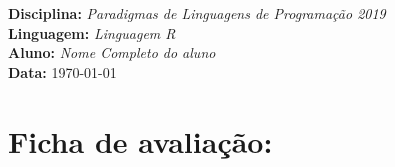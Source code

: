 

\noindent
\textbf{Disciplina:} \textit{Paradigmas de Linguagens de Programa\c{c}\~{a}o 2019}\\
\textbf{Linguagem:} \textit{Linguagem R}\\
\textbf{Aluno:} \textit{Nome Completo do aluno}\\
\textbf{Data:} \today

\section*{Ficha de avalia\c{c}\~{a}o:}



